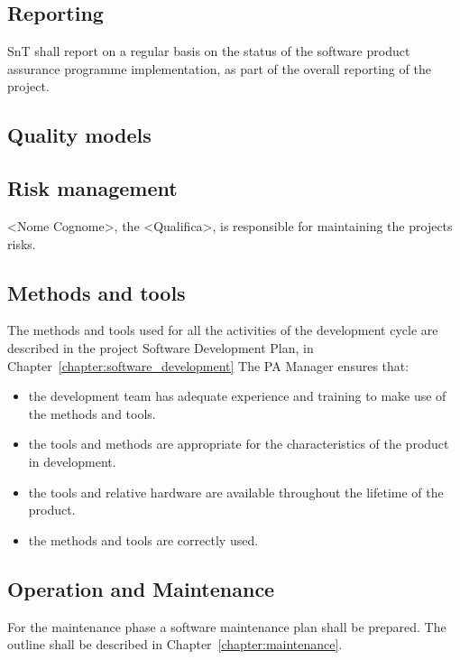 \subsection{Reporting}
SnT shall report on a regular basis on the status of the software product assurance programme implementation, as part of the overall reporting of the project.

\subsection{Quality models}

\subsection{Risk management}
<Nome Cognome>, the <Qualifica>, is responsible for maintaining the projects risks.



\subsection{Methods and tools}

The methods and tools used for all the activities of the development cycle are described in the project Software Development Plan, in Chapter~\ref{chapter:software_development}
The PA Manager ensures that:
\begin{itemize}
  \item the development team has adequate experience and training to make use of  the methods and tools.
  \item the tools and methods are appropriate for the characteristics of the product in development.
  \item the tools and relative hardware are available throughout the lifetime of the product.
  \item the methods and tools are correctly used.
\end{itemize}


\subsection{Operation and Maintenance}
For the maintenance phase a software maintenance plan shall be prepared.
The outline shall be described in Chapter~\ref{chapter:maintenance}.
